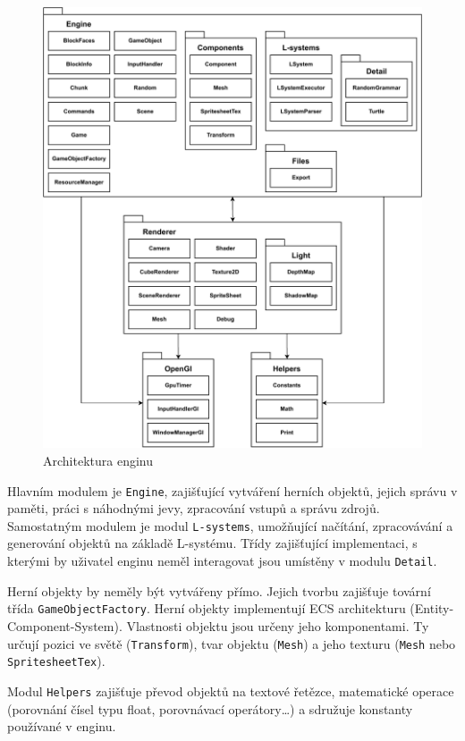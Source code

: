 \documentclass[thesis=M,czech]{FITthesis}[2019/12/23]
\begin{document}
\begin{figure}\centering
	\includegraphics[width=\textwidth]{images/architecture}
	\caption[Architektura enginu]{Architektura enginu}\label{fig:architecture}
\end{figure}

Hlavním modulem je \texttt{Engine}, zajišťující vytváření herních objektů, jejich správu v paměti, práci s náhodnými jevy, zpracování vstupů a správu zdrojů. Samostatným modulem je modul \texttt{L-systems}, umožňující načítání, zpracovávání a generování objektů na základě L-systému. Třídy zajišťující implementaci, s kterými by uživatel enginu neměl interagovat jsou umístěny v modulu \texttt{Detail}.

Herní objekty by neměly být vytvářeny přímo. Jejich tvorbu zajišťuje tovární třída \texttt{GameObjectFactory}. Herní objekty implementují ECS architekturu (Entity-Component-System). Vlastnosti objektu jsou určeny jeho komponentami. Ty určují pozici ve světě (\texttt{Transform}), tvar objektu (\texttt{Mesh}) a jeho texturu (\texttt{Mesh} nebo \texttt{SpritesheetTex}).

Modul \texttt{Helpers} zajišťuje převod objektů na textové řetězce, matematické operace (porovnání čísel typu float, porovnávací operátory\dots) a sdružuje konstanty používané v enginu.
\end{document}
